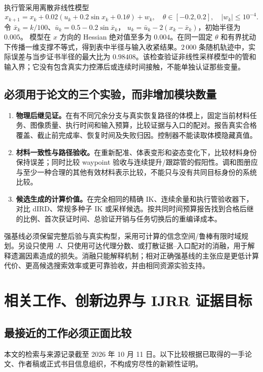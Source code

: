 \documentclass[UTF8,fontset=fandol,zihao=5,a4paper]{ctexart}
\theoremstyle{definition}
\theoremstyle{remark}\newtheorem{remark}[theorem]{说明}
\numberwithin{equation}{section}
\begin{document}
执行管采用离散非线性模型
\[
x_{k+1}=x_k+0.02(u_k+0.2\sin x_k+0.1\theta)+w_k,\quad
\theta\in[-0.2,0.2],\quad |w_k|\le10^{-4}.
\]
令 $\bar x_k=k/100$、$\bar u_k=0.5-0.2\sin\bar x_k$，
$u_k=\bar u_k-2(x_k-\bar x_k)$，初始半径为 $0.005$。
模型在 $x$ 方向的 Hessian 绝对值至多为 $0.004$。在同一固定 $\theta$ 和有界扰动下传播一维支撑不等式，得到表中半径与输入收紧结果。$2\,000$ 条随机轨迹中，实际误差与当步证书半径的最大比为 $0.98408$。该检查验证非线性采样模型中的管和输入界；它没有包含真实力控滞后或连续时间接触，不能单独认证那些变量。

\subsection{必须用于论文的三个实验，而非增加模块数量}
\begin{enumerate}
\item \textbf{物理后继见证。}在有不同冗余分支与真实恢复路径的体模上，固定当前材料任务、图像质量、执行时间和输入预算，比较证据与入口的配对。报告真实合格覆盖、截止前完成率、恢复时间及失败归因。控制器不能读取体模隐藏真值。
\item \textbf{材料一致性与路径验收。}在重新配准、体表变形和姿态变化下，比较材料身份保持误差；同时比较 waypoint 验收与连续提升/跟踪管的假阳性。调和图册应与至少一种合理的其他有效材料表示比较，不能只与没有共同目标身份的系统比较。
\item \textbf{候选生成的计算价值。}在完全相同的精确 IK、连续余量和执行管验收器下，对比 dIRD、常规多种子 IK 或采样候选。按共同时间预算报告找到合格后继的比例、首次获证时间、总验证开销与任务切换后的重编译成本。
\end{enumerate}
强基线必须保留完整后验与真实构型，采用可计算的信念空间/鲁棒有限时域规划。另设只使用 $J$、只使用可达代理分数、或打散证据--入口配对的消融，用于解释遗漏因素造成的损失。消融只能解释机制；相对正确强基线的主张应是更低计算代价、更高候选搜索效率或更可靠验收，并由相同资源实验支持。

\section{相关工作、创新边界与 IJRR 证据目标}
\label{sec:novelty73}

\subsection{最接近的工作必须正面比较}
本文的检索与来源记录截至 2026 年 10 月 11 日。以下比较根据已取得的一手论文、作者稿或正式书目信息组织，不构成穷尽性的新颖性证明。
\end{document}
